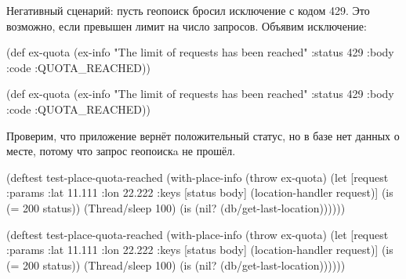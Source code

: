 \fi


Негативный сценарий: пусть геопоиск бросил исключение с кодом 429. Это
возможно, если превышен лимит на число запросов. Объявим исключение:

\ifnarrow

\begin{english}
  \begin{clojure}
(def ex-quota
  (ex-info
    "The limit of requests
               has been reached"
    {:status 429
     :body {:code :QUOTA_REACHED}}))
  \end{clojure}
\end{english}

\else

\begin{english}
  \begin{clojure}
(def ex-quota
  (ex-info "The limit of requests has been reached"
           {:status 429 :body {:code :QUOTA_REACHED}}))
  \end{clojure}
\end{english}

\fi

Проверим, что приложение вернёт положительный статус, но в базе нет данных о
месте, потому что запрос геопоискa не прошёл.

\ifnarrow

\begin{english}
  \begin{clojure}
(deftest test-place-quota-reached
 (with-place-info
   (throw ex-quota)
   (let [request {:params {:lat 11.111
                          :lon 22.222}}
        {:keys [status body]}
        (location-handler request)]
      (is (= 200 status))
      (Thread/sleep 100)
      (is (nil?
            (db/get-last-location))))))
  \end{clojure}
\end{english}

\else

\begin{english}
  \begin{clojure}
(deftest test-place-quota-reached
  (with-place-info
    (throw ex-quota)
    (let [request {:params {:lat 11.111 :lon 22.222}}
          {:keys [status
                  body]} (location-handler request)]
      (is (= 200 status))
      (Thread/sleep 100)
      (is (nil? (db/get-last-location))))))
  \end{clojure}
\end{english}


